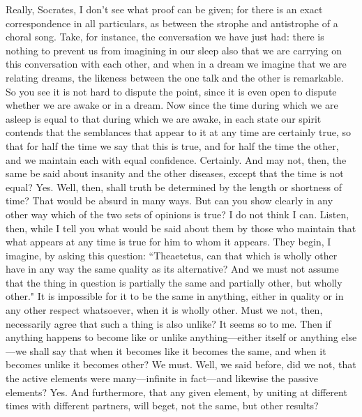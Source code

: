 \documentclass[letterpaper,12pt]{article}
\newcommand{\stephpag}[1]{\marginnote{\small\itshape\fontfamily{ppl}\selectfont #1}}
\begin{document}
\begin{drama}
\theaetetusspeaks
Really, Socrates, I don't see what proof can be given; for there is an exact correspondence in all particulars, as between the strophe and antistrophe of a choral song. Take, for instance, the conversation we have just had: there is nothing to prevent us from imagining in our sleep also that we are carrying on this conversation with each other, and when in a dream we imagine that we are relating dreams, the likeness between the one talk and the other is remarkable.
\socratesspeaks
So you see it is not hard to dispute the point, since it is even open to dispute whether we are awake or in a dream. \stephpag{d} Now since the time during which we are asleep is equal to that during which we are awake, in each state our spirit contends that the semblances that appear to it at any time are certainly true, so that for half the time we say that this is true, and for half the time the other, and we maintain each with equal confidence.
\theaetetusspeaks
Certainly.
\socratesspeaks
And may not, then, the same be said about insanity and the other diseases, except that the time is not equal?
\theaetetusspeaks
Yes.
\socratesspeaks
Well, then, shall truth be determined by the length or shortness of time? \stephpag{e}
\theaetetusspeaks
That would be absurd in many ways.
\socratesspeaks
But can you show clearly in any other way which of the two sets of opinions is true?
\theaetetusspeaks
I do not think I can.
\socratesspeaks
Listen, then, while I tell you what would be said about them by those who maintain that what appears at any time is true for him to whom it appears. They begin, I imagine, by asking this question: ``Theaetetus, can that which is wholly other have in any way the same quality as its alternative? And we must not assume that the thing in question is partially the same and partially other, but wholly other."
\theaetetusspeaks
It is impossible for it to be the same in anything, either in quality \stephpag{159 a} or in any other respect whatsoever, when it is wholly other.
\socratesspeaks
Must we not, then, necessarily agree that such a thing is also unlike?
\theaetetusspeaks
It seems so to me.
\socratesspeaks
Then if anything happens to become like or unlike anything—either itself or anything else—we shall say that when it becomes like it becomes the same, and when it becomes unlike it becomes other?
\theaetetusspeaks
We must.
\socratesspeaks
Well, we said before, did we not, that the active elements were many—infinite in fact—and likewise the passive elements?
\theaetetusspeaks
Yes.
\socratesspeaks
And furthermore, that any given element, by uniting at different times with different partners, will beget, not the same, but other results? \stephpag{b}

\end{drama}
\end{document}
